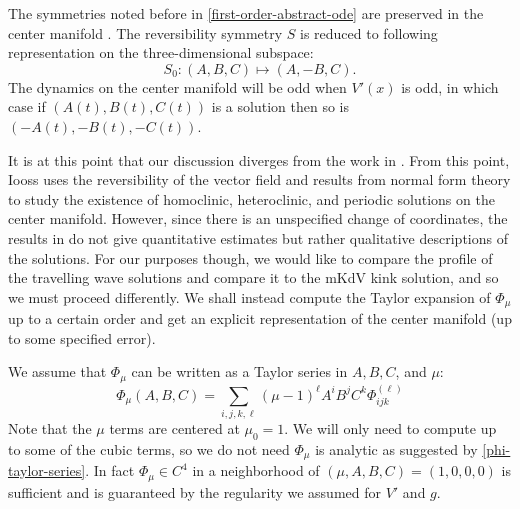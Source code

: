 The symmetries noted before in \cref{first-order-abstract-ode} are preserved in the center manifold \cite{vanderbauwhede1992center}. The reversibility symmetry \(S\) is reduced to following representation on the three-dimensional subspace:
\begin{equation}
	S_0: (A, B, C) \mapsto (A, -B, C).
\end{equation}
The dynamics on the center manifold will be odd when \(V'(x)\) is odd, in which case if  \((A(t),B(t),C(t))\) is a solution then so is \((-A(t), -B(t), -C(t))\).

It is at this point that our discussion diverges from the work in \cite{iooss2000travelling}. From this point, Iooss uses the reversibility of the vector field and results from normal form theory to study the existence of homoclinic, heteroclinic, and periodic solutions on the center manifold. However, since there is an unspecified change of coordinates, the results in \cite{iooss2000travelling} do not give quantitative estimates but rather qualitative descriptions of the solutions. For our purposes though, we would like to compare the profile of the travelling wave solutions and compare it to the mKdV kink solution, and so we must proceed differently. We shall instead compute the Taylor expansion of \(\Phi_\mu\) up to a certain order and get an explicit representation of the center manifold (up to some specified error).


We assume that \(\Phi_\mu\) can be written as a Taylor series in \(A,B,C\), and \(\mu\):
\begin{equation}\label{phi-taylor-series}
	\Phi_\mu(A,B,C) = \sum_{i,j,k,\ell} (\mu - 1)^\ell A^i B^j C^k \Phi^{(\ell)}_{ijk} 
\end{equation}
Note that the \(\mu\) terms are centered at \(\mu_0 = 1\). We will only need to compute up to some of the cubic terms, so we do not need \(\Phi_\mu\) is analytic as suggested by \cref{phi-taylor-series}. In fact \(\Phi_\mu \in C^4\) in a neighborhood of \((\mu, A, B, C) = (1,0,0,0)\) is sufficient and is guaranteed by the regularity we assumed for \(V'\) and \(g\).

